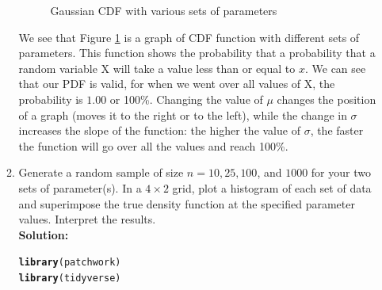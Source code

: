 \documentclass{article}\usepackage[]{graphicx}\usepackage[]{color}
\makeatletter
\newcommand{\hlstd}[1]{\textcolor[rgb]{0.345,0.345,0.345}{#1}}%
\newcommand{\hlkwd}[1]{\textcolor[rgb]{0.737,0.353,0.396}{\textbf{#1}}}%
\newenvironment{kframe}{%
 \def\at@end@of@kframe{}%
 \ifinner\ifhmode%
  \def\at@end@of@kframe{\end{minipage}}%
  \begin{minipage}{\columnwidth}%
 \fi\fi%
 \def\FrameCommand##1{\hskip\@totalleftmargin \hskip-\fboxsep
 \colorbox{shadecolor}{##1}\hskip-\fboxsep
     \hskip-\linewidth \hskip-\@totalleftmargin \hskip\columnwidth}%
 \MakeFramed {\advance\hsize-\width
   \@totalleftmargin\z@ \linewidth\hsize
   \@setminipage}}%
 {\par\unskip\endMakeFramed%
 \at@end@of@kframe}
\newenvironment{knitrout}{}{} %
\makeatother
\begin{document}
\begin{enumerate}
\begin{enumerate}
\begin{figure}[H]
\begin{center}
\caption{Gaussian CDF with various sets of parameters}
\label{plot2} %
\end{center}
\end{figure}

We see that Figure \ref{plot2} is a graph of CDF function with different sets of parameters. This function shows the probability that a probability that a random variable X will take a value less than or equal to $x$. We can see that our PDF is valid, for when we went over all values of X, the probability is $1.00$ or 100\%. Changing the value of $\mu$ changes the position of a graph (moves it to the right or to the left), while the change in $\sigma$ increases the slope of the function: the higher the value of $\sigma$, the faster the function will go over all the values and reach 100\%.
  \item Generate a random sample of size $n=10, 25, 100$, and $1000$ for your 
  two sets of parameter(s). In a $4 \times 2$ grid, plot a histogram of each set
  of data and superimpose the true density function at the specified parameter 
  values. Interpret the results.\\
  
  \textbf{Solution:}\\

\begin{knitrout}
\color{fgcolor}\begin{kframe}
\begin{alltt}
        \hlkwd{library}\hlstd{(patchwork)}
        \hlkwd{library}\hlstd{(tidyverse)}


\end{alltt}
\end{kframe}
\end{knitrout}
\end{enumerate}
\end{enumerate}
\end{document}
